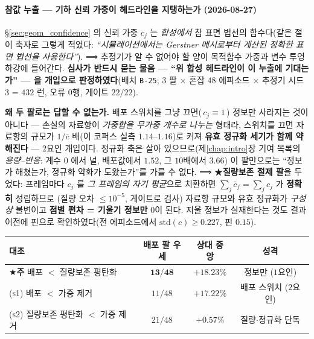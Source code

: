 \documentclass[11pt]{report}
\numberwithin{equation}{chapter}
\numberwithin{figure}{chapter}
\numberwithin{table}{chapter}
\begin{document}
\paragraph{참값 누출 --- 기하 신뢰 가중이 헤드라인을 지탱하는가 (2026-08-27)}
\label{sec:ablation_conf}
\S\ref{sec:geom_confidence} 의 신뢰 가중 $c_j$ 는 \emph{합성에서} 참 표면 법선의
함수다(같은 절이 축자로 그렇게 적었다: \emph{``시뮬레이션에서는 Gerstner 메시로부터
계산된 정확한 표면 법선을 사용한다''}). ⟹ 추정기가 알 수 없어야 할 양이 목적함수
가중과 변수 투영 하강에 들어간다. \textbf{심사가 반드시 묻는 물음 --- ``위 합성
헤드라인이 이 누출에 기대는가'' --- 을 개입으로 판정하였다}(배치 \texttt{B-25};
$3$ 팔 $\times$ 혼잡 $48$ 에피소드 $\times$ 추정기 시드 $3$ = $432$ 런, 오류 $0$행,
게이트 $22/22$).

\textbf{왜 두 팔로는 답할 수 없는가.} 배포 스위치를 그냥 끄면(\,$c_j \equiv 1$\,)
정보만 사라지는 것이 아니다 --- 손실의 자료항이 \emph{가중합을 무가중 개수로 나누는}
형태라, 스위치를 끄면 자료항의 규모가 $1/\bar{c}$ 배(이 코퍼스 실측
$1.14$--$1.16$)로 커져 \textbf{유효 정규화 세기가 함께 약해진다} --- $2$요인 개입이다.
정규화 축은 살아 있으므로(제\ref{chap:intro}장 기여 목록의 \emph{용량--반응}: 계수 $0$
에서 널, 배포값에서 $1.52$, 그 $10$배에서 $3.66$) 이 팔만으로는
``정보가 해쳤는가, 정규화 약화가 도왔는가''를 가를 수 없다.
⟹ ★\textbf{질량보존 절제 팔}을 두었다: 프레임마다 $c_j$ 를 \emph{그 프레임의 자기
평균}으로 치환하면 $\sum_j \bar{c}_f = \sum_j c_j$ 가 \textbf{정확히} 성립하므로
(질량 오차 $\le 10^{-5}$, 게이트로 검사) 자료항 규모와 유효 정규화가 \emph{구성상}
불변이고 \textbf{점별 편차 = 기울기 정보만} $0$이 된다. 지울 정보가 실재한다는 것도
결과 이전에 핀으로 확인하였다(전 에피소드에서 $\mathrm{std}(c) \ge 0.227$, 핀 $0.15$).

\begin{center}
\begin{tabular}{lccc}
\toprule
대조 & 배포 팔 우세 & 상대 중앙 & 성격 \\
\midrule
★\textbf{주} 배포 $<$ 질량보존 평탄화 & $\mathbf{13/48}$ & $\mathbf{+18.23\%}$ & 정보만 ($1$요인) \\
\textsc{(s1)} 배포 $<$ 가중 제거 & $11/48$ & $+17.22\%$ & 배포 스위치 ($2$요인) \\
\textsc{(s2)} 질량보존 평탄화 $<$ 가중 제거 & $21/48$ & $+0.57\%$ & 질량$\cdot$정규화 단독 \\
\bottomrule
\end{tabular}
\end{center}
\end{document}
